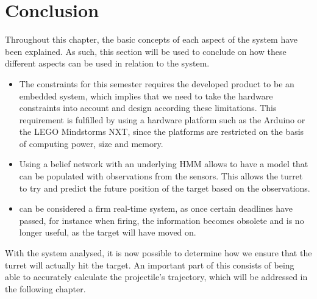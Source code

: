 \section{Conclusion}\label{EmbConc}

Throughout this chapter, the basic concepts of each aspect of the system have
been explained. As such, this section will be used to conclude on how these
different aspects can be used in relation to the \name system.

\begin{itemize}
  \item The constraints for this semester requires the developed product to be
  an embedded system, which implies that we need to take the
  hardware constraints into account and design according these limitations.
  This requirement is fulfilled by using a hardware platform such as the Arduino or
  the LEGO Mindstorms NXT, since the platforms are restricted on the basis of
  computing power, size and memory.
  \item Using a belief network with an underlying HMM allows \name to have a
  model that can be populated with observations from the sensors. This allows
  the turret to try and predict the future position of the target based on the
  observations.
  \item \name can be considered a firm real-time system, as once certain
  deadlines have passed, for instance when firing, the information becomes
  obsolete and is no longer useful, as the target will have moved on. 
\end{itemize}  

With the system analysed, it is now possible to determine how we ensure that
the turret will actually hit the target. An important part of this consists of
being able to accurately calculate the projectile's trajectory, which will be
addressed in the following chapter.


% 
